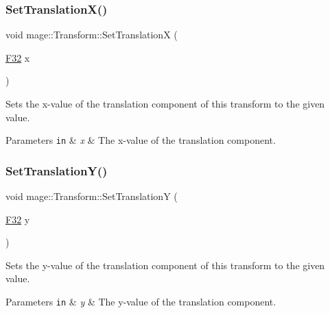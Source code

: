 \subsubsection{\texorpdfstring{Set\+Translation\+X()}{SetTranslationX()}}
{\footnotesize\ttfamily void mage\+::\+Transform\+::\+Set\+TranslationX (\begin{DoxyParamCaption}\item[{\hyperlink{namespacemage_aa97e833b45f06d60a0a9c4fc22ae02c0}{F32}}]{x }\end{DoxyParamCaption})\hspace{0.3cm}{\ttfamily [noexcept]}}

Sets the x-\/value of the translation component of this transform to the given value.


\begin{DoxyParams}[1]{Parameters}
\mbox{\tt in}  & {\em x} & The x-\/value of the translation component. \\
\hline
\end{DoxyParams}
\hypertarget{classmage_1_1_transform_ae33a9ea844cac0bdb303e4e347e576c3}{}\label{classmage_1_1_transform_ae33a9ea844cac0bdb303e4e347e576c3} 
\subsubsection{\texorpdfstring{Set\+Translation\+Y()}{SetTranslationY()}}
{\footnotesize\ttfamily void mage\+::\+Transform\+::\+Set\+TranslationY (\begin{DoxyParamCaption}\item[{\hyperlink{namespacemage_aa97e833b45f06d60a0a9c4fc22ae02c0}{F32}}]{y }\end{DoxyParamCaption})\hspace{0.3cm}{\ttfamily [noexcept]}}

Sets the y-\/value of the translation component of this transform to the given value.


\begin{DoxyParams}[1]{Parameters}
\mbox{\tt in}  & {\em y} & The y-\/value of the translation component. \\
\hline
\end{DoxyParams}
\hypertarget{classmage_1_1_transform_a71009b20361c01c0ffbd981986d323e8}{}\label{classmage_1_1_transform_a71009b20361c01c0ffbd981986d323e8} 
